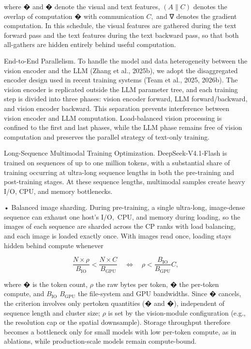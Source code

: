 \documentclass[
  10
]{article}
\begin{document}
where � and � denote the visual and text features,
\(\left( A \parallel C \right)\) denotes the overlap of computation �
with communication \(C ,\) and ∇ denotes the gradient computation. In
this schedule, the visual features are gathered during the text forward
pass and the text features during the text backward pass, so that both
all-gathers are hidden entirely behind useful computation.

End-to-End Parallelism. To handle the model and data heterogeneity
between the vision encoder and the LLM (Zhang et al., 2025b), we adopt
the disaggregated encoder design used in recent training systems (Team
et al., 2025, 2026b). The vision encoder is replicated outside the LLM
parameter tree, and each training step is divided into three phases:
vision encoder forward, LLM forward/backward, and vision encoder
backward. This separation prevents interference between vision encoder
and LLM computation. Load-balanced vision processing is confined to the
first and last phases, while the LLM phase remains free of vision
computation and preserves the parallel strategy of text-only training.

Long-Sequence Multimodal Training Optimization. DeepSeek-V4.1-Flash is
trained on sequences of up to one million tokens, with a substantial
share of training occurring at ultra-long sequence lengths in both the
pre-training and post-training stages. At these sequence lengths,
multimodal samples create heavy I/O, CPU, and memory bottlenecks.

• Balanced image sharding. During pre-training, a single ultra-long,
image-dense sequence can exhaust one host's
\(\mathrm { I } / \mathrm { O } ,\) CPU, and memory during loading, so
the images of each sequence are sharded across the CP ranks with load
balancing, and each image is loaded exactly once. With images read once,
loading stays hidden behind compute whenever

\[
\frac {N \times \rho}{B _ {\mathrm{IO}}} <   \frac {N \times C}{B _ {\mathrm{GPU}}} \quad \Longleftrightarrow \quad \rho <   \frac {B _ {\mathrm{IO}}}{B _ {\mathrm{GPU}}} C,
\]

where � is the token count, \(\rho\) the raw bytes per token, � the
per-token compute, and \(B _ { \mathrm { I O } }\)
\(B _ { \mathrm { G P U } }\) the file-system and GPU bandwidths. Since
� cancels, the criterion involves only pertoken quantities (� and �),
independent of sequence length and cluster size; \(\rho\) is set by the
vision-module configuration (e.g., the resolution cap or the spatial
downsample). Storage throughput therefore becomes a bottleneck only for
small models with low per-token compute, as in ablations, while
production-scale models remain compute-bound.
\end{document}
